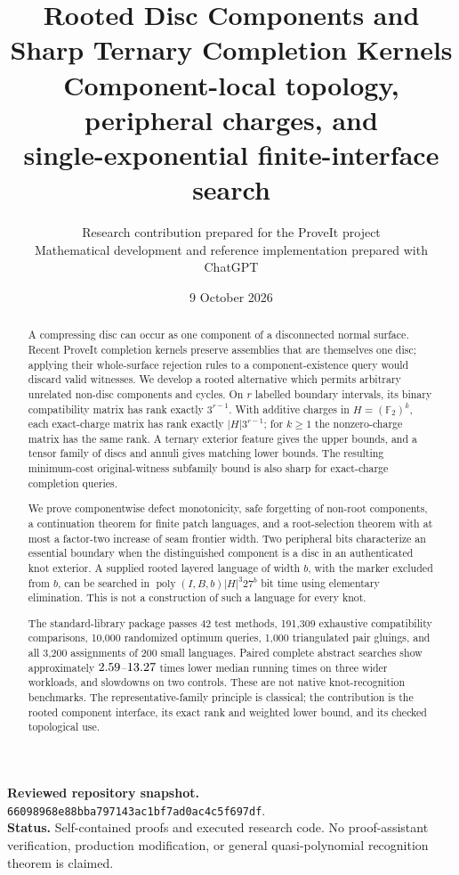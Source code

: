 \documentclass[11pt,letterpaper]{article}
\title{\vspace{-1em}\textbf{Rooted Disc Components and\\Sharp Ternary Completion Kernels}\\[0.7em]
\large Component-local topology, peripheral charges, and\\single-exponential finite-interface search}
\author{Research contribution prepared for the ProveIt project\\
\small Mathematical development and reference implementation prepared with ChatGPT}
\date{9 October 2026}
\theoremstyle{definition}
\newcommand{\F}{\mathbb F}
\newcommand{\poly}{\operatorname{poly}}
\newcommand{\pin}{\texttt{66098968e88bba797143ac1bf7ad0ac4c5f697df}}
\begin{document}
\maketitle
\begin{abstract}
A compressing disc can occur as one component of a disconnected normal surface. Recent ProveIt completion kernels preserve assemblies that are themselves one disc; applying their whole-surface rejection rules to a component-existence query would discard valid witnesses. We develop a rooted alternative which permits arbitrary unrelated non-disc components and cycles. On $r$ labelled boundary intervals, its binary compatibility matrix has rank exactly $3^{r-1}$. With additive charges in $H=(\F_2)^k$, each exact-charge matrix has rank exactly $|H|3^{r-1}$; for $k\geq1$ the nonzero-charge matrix has the same rank. A ternary exterior feature gives the upper bounds, and a tensor family of discs and annuli gives matching lower bounds. The resulting minimum-cost original-witness subfamily bound is also sharp for exact-charge completion queries.

We prove componentwise defect monotonicity, safe forgetting of non-root components, a continuation theorem for finite patch languages, and a root-selection theorem with at most a factor-two increase of seam frontier width. Two peripheral bits characterize an essential boundary when the distinguished component is a disc in an authenticated knot exterior. A supplied rooted layered language of width $b$, with the marker excluded from $b$, can be searched in $\poly(I,B,b)|H|^3 27^b$ bit time using elementary elimination. This is not a construction of such a language for every knot.

The standard-library package passes 42 test methods, 191,309 exhaustive compatibility comparisons, 10,000 randomized optimum queries, 1,000 triangulated pair gluings, and all 3,200 assignments of 200 small languages. Paired complete abstract searches show approximately $2.59$--$13.27$ times lower median running times on three wider workloads, and slowdowns on two controls. These are not native knot-recognition benchmarks. The representative-family principle is classical; the contribution is the rooted component interface, its exact rank and weighted lower bound, and its checked topological use.
\end{abstract}
\vfill
\noindent\small\textbf{Reviewed repository snapshot.} \pin.\\
\textbf{Status.} Self-contained proofs and executed research code. No proof-assistant verification, production modification, or general quasi-polynomial recognition theorem is claimed.
\thispagestyle{empty}\clearpage
\tableofcontents\clearpage
\end{document}
